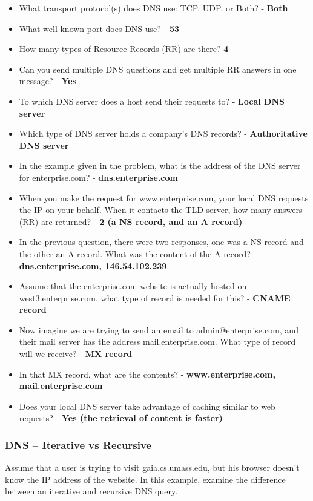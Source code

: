 \documentclass{article}
\begin{document}
\begin{itemize}
	\item What transport protocol(s) does DNS use: TCP, UDP, or Both? - \textbf{Both}
	\item What well-known port does DNS use? - \textbf{53}
	\item How many types of Resource Records (RR) are there? \textbf{4}
	\item Can you send multiple DNS questions and get multiple RR answers in one message? - \textbf{Yes}
	\item To which DNS server does a host send their requests to? - \textbf{Local DNS server}
	\item Which type of DNS server holds a company's DNS records? - \textbf{Authoritative DNS server}
	\item In the example given in the problem, what is the address of the DNS server for enterprise.com? - \textbf{dns.enterprise.com}
	\item When you make the request for www.enterprise.com, your local DNS requests the IP on your behalf. When it contacts the TLD server, how many answers (RR) are returned? - \textbf{2 (a NS record, and an A record)}
	\item In the previous question, there were two responses, one was a NS record and the other an A record. What was the content of the A record? - \textbf{dns.enterprise.com, 146.54.102.239}
	\item Assume that the enterprise.com website is actually hosted on west3.enterprise.com, what type of record is needed for this? - \textbf{CNAME record}
	\item Now imagine we are trying to send an email to admin@enterprise.com, and their mail server has the address mail.enterprise.com. What type of record will we receive? - \textbf{MX record}
	\item In that MX record, what are the contents? - \textbf{www.enterprise.com, mail.enterprise.com}
	\item Does your local DNS server take advantage of caching similar to web requests? - \textbf{Yes (the retrieval of content is faster)}
\end{itemize}

\subsubsection{DNS -- Iterative vs Recursive}
Assume that a user is trying to visit gaia.cs.umass.edu, but his browser doesn't know the IP address of the website. In this example, examine the difference between an iterative and recursive DNS query. \\
\end{document}

